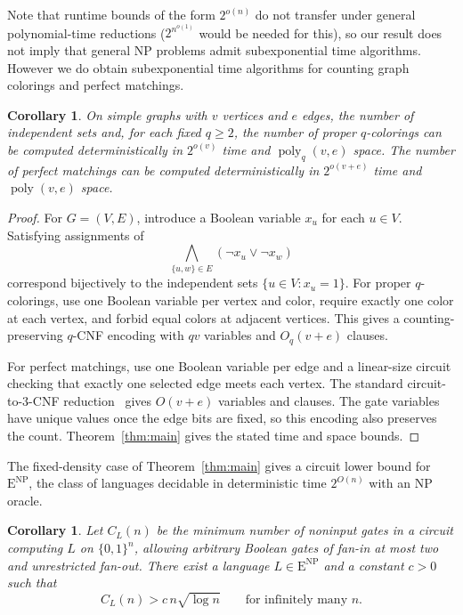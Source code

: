 \documentclass[11pt,reqno]{amsart}
\numberwithin{equation}{section}
\newtheorem{corollary}[theorem]{Corollary}
\theoremstyle{definition}\newtheorem{definition}[theorem]{Definition}
\theoremstyle{remark}\newtheorem{remark}[theorem]{Remark}
\newcommand{\poly}{\operatorname{poly}}
\renewcommand{\ge}{\geqslant}
\begin{document}
Note that runtime bounds of the form $2^{o(n)}$ do not transfer under general polynomial-time reductions ($2^{n^{o(1)}}$ would be needed for this), so our result does not imply that general NP problems admit subexponential time algorithms. However we do obtain subexponential time algorithms for counting graph colorings and perfect matchings.

\begin{corollary}\label{cor:graph-counting}
On simple graphs with $v$ vertices and $e$ edges, the number of
independent sets and, for each fixed $q\ge2$, the number of proper
$q$-colorings can be computed deterministically in $2^{o(v)}$ time
and $\poly_q(v,e)$ space. The number of perfect matchings can be
computed deterministically in $2^{o(v+e)}$ time and $\poly(v,e)$ space.
\end{corollary}
\begin{proof}
For $G=(V,E)$, introduce a Boolean variable $x_u$ for each $u\in V$.
Satisfying assignments of
\[
 \bigwedge_{\{u,w\}\in E}(\neg x_u\vee\neg x_w)
\]
correspond bijectively to the independent sets $\{u\in V:x_u=1\}$.
For proper $q$-colorings, use one Boolean variable per vertex and
color, require exactly one color at each vertex, and forbid equal
colors at adjacent vertices. This gives a counting-preserving
$q$-CNF encoding with $qv$ variables and $O_q(v+e)$ clauses.

For perfect matchings, use one Boolean variable per edge and a
linear-size circuit checking that exactly one selected edge meets
each vertex. The standard circuit-to-$3$-CNF
reduction~\cite[Lemmas~15.9--15.10]{Bar23} gives $O(v+e)$ variables
and clauses. The gate variables have unique values once the edge
bits are fixed, so this encoding also preserves the count.
Theorem~\ref{thm:main} gives the stated time and space bounds.
\end{proof}

The fixed-density case of Theorem~\ref{thm:main} gives a circuit lower
bound for $\mathrm E^{\mathrm{NP}}$, the class of languages decidable
in deterministic time $2^{O(n)}$ with an NP oracle.

\begin{corollary}\label{cor:quantitative-circuits}
Let $C_L(n)$ be the minimum number of noninput gates in a circuit
computing $L$ on $\{0,1\}^n$, allowing arbitrary Boolean gates of
fan-in at most two and unrestricted fan-out. There exist a language
$L\in\mathrm E^{\mathrm{NP}}$ and a constant $c>0$ such that
\begin{equation}\label{eq:quantitative-circuit-lower-bound}
 C_L(n)>c\,n\sqrt{\log n}\qquad\text{for infinitely many }n.
\end{equation}
\end{corollary}
\end{document}

